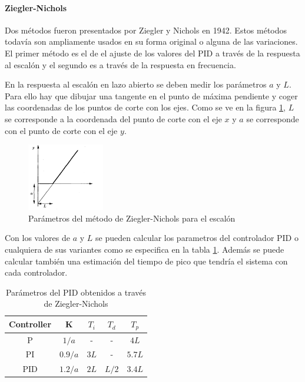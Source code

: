 \documentclass{book}
\begin{document}
		\paragraph{Ziegler-Nichols}

Dos m\'etodos fueron presentados por Ziegler y Nichols en 1942. Estos m\'etodos todav\'ia son ampliamente usados en su forma original o alguna de las variaciones. El primer m\'etodo es el de el ajuste de los valores del PID a trav\'es de la respuesta al escal\'on y el segundo es a trav\'es de la respuesta en frecuencia. \par 

En la respuesta al escal\'on en lazo abierto se deben medir los par\'ametros $a$ y $L$. Para ello hay que dibujar una tangente en el punto de m\'axima pendiente y coger las coordenadas de los puntos de corte con los ejes. Como se ve en la figura \ref{ZNstep}, $L$ se corresponde a la coordenada del punto de corte con el eje $x$ y $a$ se corresponde con el punto de corte con el eje $y$. 

\begin{figure}[h!]
\centering
\includegraphics[width=0.3\textwidth]{ZNstep.PNG}
\caption{Par\'ametros del m\'etodo de Ziegler-Nichols para el escal\'on \cite{PIDbook}}
\label{ZNstep}
\end{figure}\par

Con los valores de $a$ y $L$ se pueden calcular los parametros del controlador PID o cualquiera de sus variantes como se especifica en la tabla \ref{ta:ZNstep}. Adem\'as se puede calcular tambi\'en una estimaci\'on del tiempo de pico que tendr\'ia el sistema con cada controlador. \par 

\begin{table}[h!]
\centering
\caption{Par\'ametros del PID obtenidos a trav\'es de Ziegler-Nichols \cite{PIDbook}}
\label{ta:ZNstep}
\begin{tabular}{c|cccc}
Controller & K     & $T_{i}$ & $T_{d}$ & $T_{p}$ \\ \hline
P          & $1/a$   & -        & -        & $4L$       \\
PI         & $0.9/a$ & $3L$       & -        & $5.7L$     \\
PID        & $1.2/a$ & $2L$       & $L/2$      & $3.4L$    
\end{tabular}
\end{table}
\end{document}
